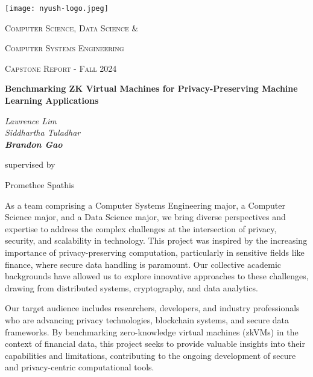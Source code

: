 \documentclass{scrartcl}
\begin{document}
\begin{titlepage}
	\centering
	\texttt{[image: nyush-logo.jpeg]}\par
	\vspace{2cm}
	{\scshape\LARGE Computer Science, Data Science \& \par}  %
	{\scshape\LARGE Computer Systems Engineering \par}
	\vspace{1cm}
	{\scshape\Large Capstone Report - Fall 2024\par}
	\vfill

	{\huge\bfseries Benchmarking ZK Virtual Machines for Privacy-Preserving Machine Learning Applications\par}
	\vfill

  {\Large\itshape Lawrence Lim\\ Siddhartha Tuladhar\\ \textbf{Brandon Gao} \\\par}
	\vspace{1.5cm}

	\vfill
	supervised by\par
	Promethee Spathis

	\vfill
\end{titlepage}

\newpage

\begin{preface}
	As a team comprising a Computer Systems Engineering major, a Computer Science major, and a Data Science major, we bring diverse perspectives and expertise to address the complex challenges at the intersection of privacy, security, and scalability in technology. This project was inspired by the increasing importance of privacy-preserving computation, particularly in sensitive fields like finance, where secure data handling is paramount. Our collective academic backgrounds have allowed us to explore innovative approaches to these challenges, drawing from distributed systems, cryptography, and data analytics.

	Our target audience includes researchers, developers, and industry professionals who are advancing privacy technologies, blockchain systems, and secure data frameworks. By benchmarking zero-knowledge virtual machines (zkVMs) in the context of financial data, this project seeks to provide valuable insights into their capabilities and limitations, contributing to the ongoing development of secure and privacy-centric computational tools.
\end{preface}
\end{document}
